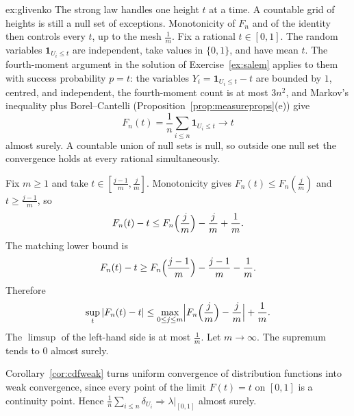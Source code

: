 \begin{solution}{ex:glivenko}
\idea The strong law handles one height $t$ at a time. A countable grid of heights is still a null set of exceptions. Monotonicity of $F_n$
and of the identity then controls every $t$, up to the mesh $\frac1m$.
\writeup Fix a rational $t\in[0,1]$. The random variables $\mathbf 1_{U_i\le t}$ are independent, take values in $\{0,1\}$, and have mean $t$.
The fourth-moment argument in the solution of Exercise~\ref{ex:salem} applies to them with success probability $p=t$: the variables
$Y_i=\mathbf 1_{U_i\le t}-t$ are bounded by $1$, centred, and independent, the fourth-moment count is at most $3n^2$, and Markov's inequality
plus Borel--Cantelli (Proposition~\ref{prop:measureprops}(e)) give
\[F_n(t)=\frac1n\sum_{i\le n}\mathbf 1_{U_i\le t}\to t\]
almost surely. A countable union of null sets is null, so outside one null set the convergence holds at every rational simultaneously.

Fix $m\ge 1$ and take $t\in[\frac{j-1}m,\frac jm]$. Monotonicity gives $F_n(t)\le F_n(\frac jm)$ and $t\ge\frac{j-1}m$, so
\[F_n(t)-t\le F_n\Bigl(\frac jm\Bigr)-\frac jm+\frac1m.\]
The matching lower bound is
\[F_n(t)-t\ge F_n\Bigl(\frac{j-1}m\Bigr)-\frac{j-1}m-\frac1m.\]
Therefore
\[\sup_t|F_n(t)-t|\le\max_{0\le j\le m}\Bigl|F_n\Bigl(\frac jm\Bigr)-\frac jm\Bigr|+\frac1m.\]
The $\limsup$ of the left-hand side is at most $\frac1m$. Let $m\to\infty$. The supremum tends to $0$ almost surely.

Corollary~\ref{cor:cdfweak} turns uniform convergence of distribution functions into weak convergence, since every point of the limit
$F(t)=t$ on $[0,1]$ is a continuity point. Hence $\frac1n\sum_{i\le n}\delta_{U_i}\Rightarrow\lambda|_{[0,1]}$ almost surely.
\end{solution}

